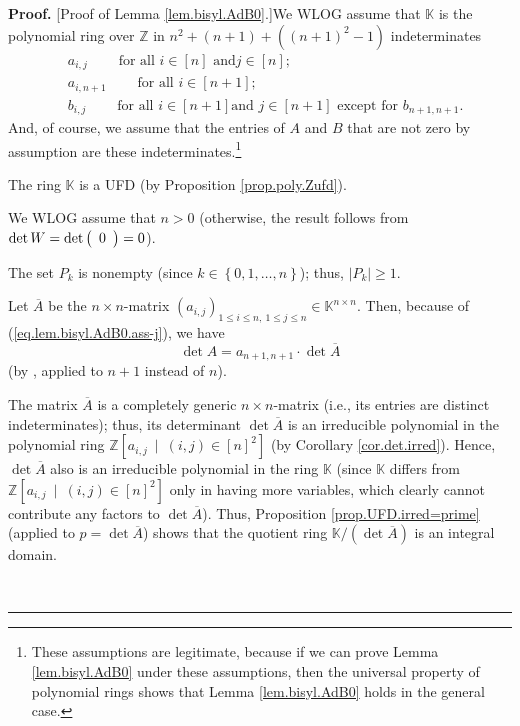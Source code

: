\documentclass[numbers=enddot,12pt,final,onecolumn,notitlepage]{scrartcl}%
\theoremstyle{definition}
\newenvironment{proof}[1][Proof]{\noindent\textbf{#1.} }{\ \rule{0.5em}{0.5em}}
\begin{document}
\begin{proof}
[Proof of Lemma \ref{lem.bisyl.AdB0}.]We WLOG assume that $\mathbb{K}$ is the
polynomial ring over $\mathbb{Z}$ in $n^{2}+\left(  n+1\right)  +\left(
\left(  n+1\right)  ^{2}-1\right)  $ indeterminates%
\begin{align*}
&  a_{i,j}\ \ \ \ \ \ \ \ \ \ \text{for all }i\in\left[  n\right]  \text{ and
}j\in\left[  n\right]  ;\\
&  a_{i,n+1}\ \ \ \ \ \ \ \ \ \ \text{for all }i\in\left[  n+1\right]  ;\\
&  b_{i,j}\ \ \ \ \ \ \ \ \ \ \text{for all }i\in\left[  n+1\right]  \text{
and }j\in\left[  n+1\right]  \text{ except for }b_{n+1,n+1}.
\end{align*}
And, of course, we assume that the entries of $A$ and $B$ that are not zero by
assumption are these indeterminates.\footnote{These assumptions are
legitimate, because if we can prove Lemma \ref{lem.bisyl.AdB0} under these
assumptions, then the universal property of polynomial rings shows that Lemma
\ref{lem.bisyl.AdB0} holds in the general case.}

The ring $\mathbb{K}$ is a UFD (by Proposition \ref{prop.poly.Zufd}).

We WLOG assume that $n>0$ (otherwise, the result follows from $\det
W=\det\left(
\begin{array}
[c]{c}%
0
\end{array}
\right)  =0$).

The set $P_{k}$ is nonempty (since $k\in\left\{  0,1,\ldots,n\right\}  $);
thus, $\left\vert P_{k}\right\vert \geq1$.

Let $\overline{A}$ be the $n\times n$-matrix $\left(  a_{i,j}\right)  _{1\leq
i\leq n,\ 1\leq j\leq n}\in\mathbb{K}^{n\times n}$. Then, because of
(\ref{eq.lem.bisyl.AdB0.ass-j}), we have
\begin{equation}
\det A=a_{n+1,n+1}\cdot\det\overline{A} \label{pf.lem.bisylAdB0.1}%
\end{equation}
(by \cite[Theorem 6.43]{detnotes}, applied to $n+1$ instead of $n$).

The matrix $\overline{A}$ is a completely generic $n\times n$-matrix (i.e.,
its entries are distinct indeterminates); thus, its determinant $\det
\overline{A}$ is an irreducible polynomial in the polynomial ring
$\mathbb{Z}\left[  a_{i,j}\ \mid\ \left(  i,j\right)  \in\left[  n\right]
^{2}\right]  $ (by Corollary \ref{cor.det.irred}). Hence, $\det\overline{A}$
also is an irreducible polynomial in the ring $\mathbb{K}$ (since $\mathbb{K}$
differs from $\mathbb{Z}\left[  a_{i,j}\ \mid\ \left(  i,j\right)  \in\left[
n\right]  ^{2}\right]  $ only in having more variables, which clearly cannot
contribute any factors to $\det\overline{A}$). Thus, Proposition
\ref{prop.UFD.irred=prime} (applied to $p=\det\overline{A}$) shows that the
quotient ring $\mathbb{K}/\left(  \det\overline{A}\right)  $ is an integral domain.


\end{proof}
\end{document}
